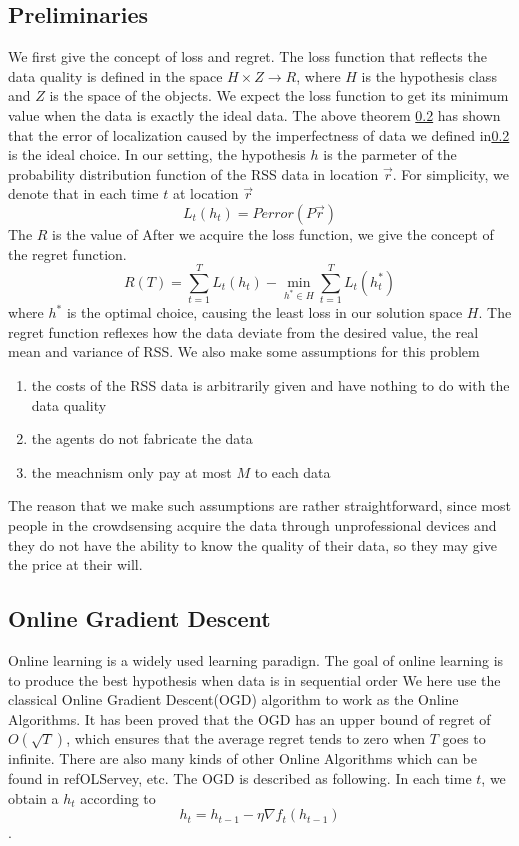 \documentclass[10pt,conference,compsocconf,letterpaper]{IEEEtran}
\begin{document}
\subsection{Preliminaries}
We first give the concept of loss and regret. The loss function that reflects the data quality is defined in the space $H\times Z\to R$, where $H$ is the hypothesis class and $Z$ is the space of the objects. We expect the loss function to get its minimum value when the data is exactly the ideal data. The above theorem \ref{} has shown that the error of localization caused by the imperfectness of data we defined in\ref{} is the ideal choice. In our setting, the hypothesis $h$ is the parmeter of the probability distribution function of the RSS data in location $\vec r$. For simplicity, we denote that in each time $t$ at location $\vec r$
\begin{equation}
L_t(h_t)=Perror(P\vec r )
\end{equation}
 The $R$ is the value of After we acquire the loss function, we give the concept of the regret function.
\begin{equation}\label{def:reg}
R(T)=\sum_{t=1}^TL_t(h_t)-\min_{h^*\in H}\sum_{t=1}^TL_t(h^*_t)
\end{equation}
where $h^*$ is the optimal choice, causing the least loss in our solution space $H$. The regret function reflexes how the data deviate from the desired value, the real mean and variance of RSS. We also make some assumptions for this problem
\begin{enumerate}
\item the costs of the RSS data is arbitrarily given and have nothing to do with the data quality
\item the agents do not fabricate the data
\item the meachnism only pay at most $M$ to each data
\end{enumerate}
The reason that we make such assumptions are rather straightforward, since most people in the crowdsensing acquire the data through unprofessional devices and they do not have the ability to know the quality of their data, so they may give the price at their will. 

\subsection{Online Gradient Descent}
Online learning is a widely used learning paradign. The goal of online learning is to produce the best hypothesis when data is in sequential order
We here use the classical Online Gradient Descent(OGD) algorithm to work as the Online Algorithms. It has been proved that the OGD has an upper bound of regret of $O(\sqrt{T})$, which ensures that the average regret tends to zero when $T$ goes to infinite. There are also many kinds of other Online Algorithms which can be found in ref{OLServey}, etc. The OGD is described as following. In each time $t$, we obtain a $h_t$ according to
\begin{equation}
h_t=h_{t-1}-\eta \nabla f_t(h_{t-1})
\end{equation}.
\end{document}

